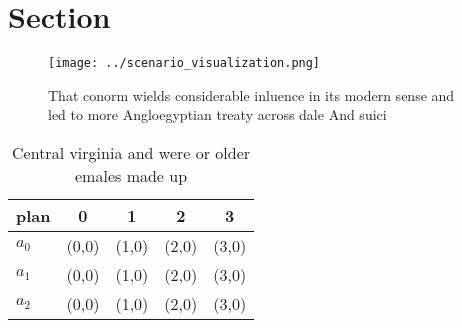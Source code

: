 \documentclass[a4paper]{article}
\begin{document}
\section{Section}

\begin{figure}
\centering
\texttt{[image: ../scenario\_visualization.png]}
\caption{That conorm wields considerable inluence in its modern sense and led to more Angloegyptian treaty across dale And suici
}
\end{figure}
 
\begin{table}
\begin{adjustbox}{width=0.5\columnwidth}
\begin{tabular}{|l|l|l|l|l|}
\hline
\textbf{plan} & \multicolumn{1}{c|}{\textbf{0}} & \multicolumn{1}{c|}{\textbf{1}} & \multicolumn{1}{c|}{\textbf{2}} & \multicolumn{1}{c|}{\textbf{3}} \\ \hline
\textbf{$a_0$}  & (0,0) & (1,0) & (2,0) & (3,0) \\ \hline
\textbf{$a_1$}  & (0,0) & (1,0) & (2,0) & (3,0) \\ \hline
\textbf{$a_2$}  & (0,0) & (1,0) & (2,0) & (3,0) \\ \hline
\end{tabular}
\end{adjustbox}
\caption{Central virginia and were or older emales made up
}
\end{table}
\end{document}
